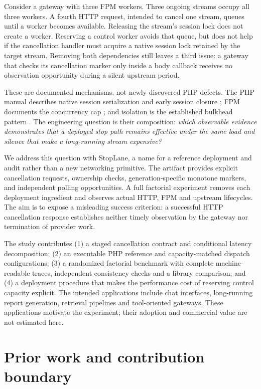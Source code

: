 \documentclass[11pt,a4paper]{article}
\begin{document}
Consider a gateway with three FPM workers. Three ongoing streams occupy all three workers. A fourth HTTP request, intended to cancel one stream, queues until a worker becomes available. Releasing the stream's session lock does not create a worker. Reserving a control worker avoids that queue, but does not help if the cancellation handler must acquire a native session lock retained by the target stream. Removing both dependencies still leaves a third issue: a gateway that checks its cancellation marker only inside a body callback receives no observation opportunity during a silent upstream period.

These are documented mechanisms, not newly discovered PHP defects. The PHP manual describes native session serialization and early session closure \cite{phpsession}; FPM documents the concurrency cap \cite{fpm}; and isolation is the established bulkhead pattern \cite{bulkhead}. The engineering question is their composition: \emph{which observable evidence demonstrates that a deployed stop path remains effective under the same load and silence that make a long-running stream expensive?}

We address this question with StopLane, a name for a reference deployment and audit rather than a new networking primitive. The artifact provides explicit cancellation requests, ownership checks, generation-specific monotone markers, and independent polling opportunities. A full factorial experiment removes each deployment ingredient and observes actual HTTP, FPM and upstream lifecycles. The aim is to expose a misleading success criterion: a successful HTTP cancellation response establishes neither timely observation by the gateway nor termination of provider work.

The study contributes (1) a staged cancellation contract and conditional latency decomposition; (2) an executable PHP reference and capacity-matched dispatch configurations; (3) a randomized factorial benchmark with complete machine-readable traces, independent consistency checks and a library comparison; and (4) a deployment procedure that makes the performance cost of reserving control capacity explicit. The intended applications include chat interfaces, long-running report generation, retrieval pipelines and tool-oriented gateways. These applications motivate the experiment; their adoption and commercial value are not estimated here.

\section{Prior work and contribution boundary}
\end{document}
